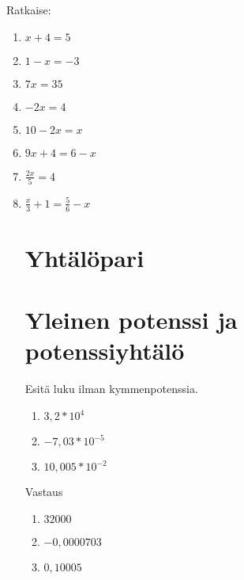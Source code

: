 \begin{tehtava}
%
Ratkaise:
\begin{enumerate}
\item $x + 4 = 5$
\item $1 - x = -3$
\item $7x = 35$
\item $-2x = 4$
\item $10 - 2x = x$
\item $9x + 4 = 6 - x$
\item $\frac{2x}{5} = 4$
\item $\frac{x}{3} + 1 = \frac{5}{6} - x$

\chapter{Yhtälöpari}


\chapter{Yleinen potenssi ja potenssiyhtälö}

\begin{tehtava}
Esitä luku ilman kymmenpotenssia.
\begin{enumerate}
\item $3,2 * 10^4$
\item $-7,03 * 10^{-5}$
\item $10,005 * 10^{-2}$
\end{enumerate}
\begin{vastaus}
Vastaus
\begin{enumerate}
\item $32000$
\item $-0,0000703$
\item $0,10005$
\end{enumerate}
\end{vastaus}
\end{tehtava}


\end{enumerate}
\end{tehtava}
